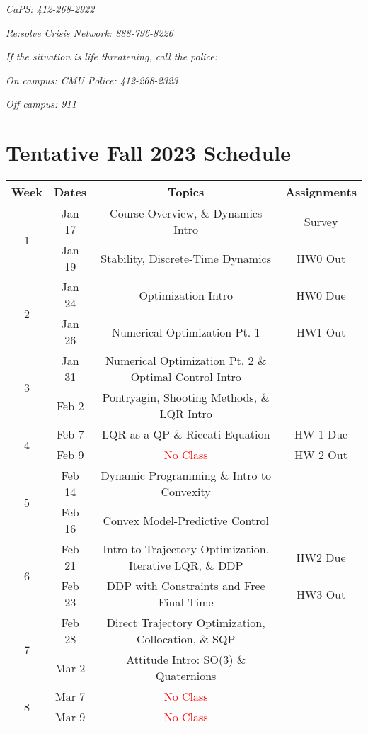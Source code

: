 \documentclass[11pt,letterpaper]{article}
\begin{document}
\textit{CaPS: 412-268-2922}

\textit{Re:solve Crisis Network: 888-796-8226}

\medskip
\noindent
\textit{If the situation is life threatening, call the police:}

\textit{On campus: CMU Police: 412-268-2323}

\textit{Off campus: 911}


\section*{Tentative Fall 2023 Schedule}

\begin{tabular}{c|c|c|c}
	Week & Dates & Topics & Assignments \\
	\hline
	\multirow{2}{*}{1} & Jan 17 & Course Overview, \& Dynamics Intro & Survey \\
	 & Jan 19 & Stability, Discrete-Time Dynamics &  HW0 Out\\
	\hline
	\multirow{2}{*}{2} & Jan 24 & Optimization Intro & HW0 Due \\
	 & Jan 26 & Numerical Optimization Pt. 1 & HW1 Out \\
	\hline
	\multirow{2}{*}{3}  & Jan 31 & Numerical Optimization Pt. 2 \& Optimal Control Intro &  \\
	 & Feb 2 & Pontryagin, Shooting Methods, \& LQR Intro &  \\
	\hline
	\multirow{2}{*}{4}  & Feb 7 & LQR as a QP \& Riccati Equation & HW 1 Due \\
	 & Feb 9 & \textcolor{red}{No Class} & HW 2 Out \\
	\hline
	\multirow{2}{*}{5}  & Feb 14 & Dynamic Programming \& Intro to Convexity & \\
	 & Feb 16 & Convex Model-Predictive Control &  \\
	\hline
	\multirow{2}{*}{6}  & Feb 21 & Intro to Trajectory Optimization, Iterative LQR, \& DDP & HW2 Due \\
	 & Feb 23 & DDP with Constraints and Free Final Time & HW3 Out \\
	\hline
	\multirow{2}{*}{7}  & Feb 28 & Direct Trajectory Optimization, Collocation, \& SQP & \\
	 & Mar 2 & Attitude Intro: SO(3) \& Quaternions & \\
	\hline
	\multirow{2}{*}{8}  & Mar 7 & \textcolor{red}{No Class} & \\
	 & Mar 9 & \textcolor{red}{No Class} &   \\

\end{tabular}
\end{document}
